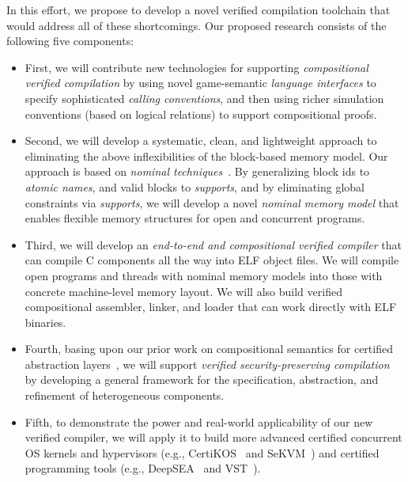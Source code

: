 In this effort, we propose to develop a novel verified compilation
toolchain that would address all of these shortcomings. Our
proposed research consists of the following five components:
\begin{itemize}
\item First, we will contribute new technologies for supporting {\em
  compositional verified compilation} by using novel game-semantic
  {\em language interfaces} to specify sophisticated {\em calling
    conventions}, and then using richer simulation conventions (based
  on logical relations) to support compositional proofs.
\item Second, we will develop a systematic, clean, and lightweight approach to
  eliminating the above inflexibilities of the block-based memory
  model. Our approach is based on \emph{nominal
  techniques}~\cite{pitts-nominal,gabby2002}. By generalizing block
  ids to {\em atomic names}, and valid blocks to {\em supports}, and by
  eliminating global constraints via {\em supports}, we will develop a
  novel {\em nominal memory model} that enables flexible memory
  structures for open and concurrent programs.
\item Third, we will develop an {\em end-to-end and compositional
  verified compiler} that can compile C components all the way into
  ELF object files. We will compile open programs and threads with
  nominal memory models into those with concrete machine-level memory
  layout. We will also build verified compositional assembler,
  linker, and loader that can work directly with ELF binaries.
\item Fourth, basing upon our prior work on compositional semantics
  for certified abstraction layers~\cite{dscal15,ccal18,koenig20,layered22},
  we will support {\em verified security-preserving
  compilation}~\cite{costanzo16} by developing a general framework
  for the specification, abstraction, and refinement of heterogeneous
  components.
\item Fifth, to demonstrate the power and real-world applicability of
  our new verified compiler, we will apply it to build more advanced
  certified concurrent OS kernels and hypervisors (e.g., CertiKOS~\cite{certikos-osdi16}
  and SeKVM~\cite{sekvm21a,sekvm21b,tao21}) and certified programming tools
    (e.g., DeepSEA~\cite{deepsea19} and VST~\cite{appel11:vst}).
\end{itemize}

